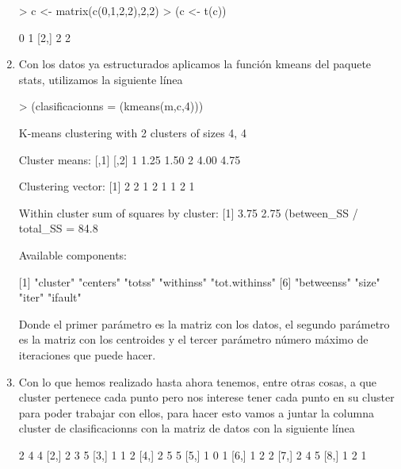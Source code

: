 \documentclass[parskip=full]{scrartcl}
\begin{document}
\begin{enumerate}
\begin{Schunk}
\begin{Sinput}
> c <- matrix(c(0,1,2,2),2,2)
> (c <- t(c))
\end{Sinput}
\begin{Soutput}
     [,1] [,2]
[1,]    0    1
[2,]    2    2
\end{Soutput}
\end{Schunk}


    \item Con los datos ya estructurados aplicamos la función kmeans del paquete stats, utilizamos la siguiente línea


\begin{Schunk}
\begin{Sinput}
> (clasificacionns = (kmeans(m,c,4)))
\end{Sinput}
\begin{Soutput}
K-means clustering with 2 clusters of sizes 4, 4

Cluster means:
  [,1] [,2]
1 1.25 1.50
2 4.00 4.75

Clustering vector:
[1] 2 2 1 2 1 1 2 1

Within cluster sum of squares by cluster:
[1] 3.75 2.75
 (between_SS / total_SS =  84.8 %

Available components:

[1] "cluster"      "centers"      "totss"        "withinss"     "tot.withinss"
[6] "betweenss"    "size"         "iter"         "ifault"      
\end{Soutput}
\end{Schunk}


    Donde el primer parámetro es la matriz con los datos, el segundo parámetro es la matriz con los centroides y el tercer parámetro número máximo de iteraciones que puede hacer.

    \item Con lo que hemos realizado hasta ahora tenemos, entre otras cosas, a que cluster pertenece cada punto pero nos interese tener cada punto en su cluster para poder trabajar con ellos, para hacer esto vamos a juntar la columna cluster de clasificacionns con la matriz de datos con la siguiente línea


\begin{Schunk}
\begin{Soutput}
     [,1] [,2] [,3]
[1,]    2    4    4
[2,]    2    3    5
[3,]    1    1    2
[4,]    2    5    5
[5,]    1    0    1
[6,]    1    2    2
[7,]    2    4    5
[8,]    1    2    1
\end{Soutput}
\end{Schunk}



\end{enumerate}
\end{document}
